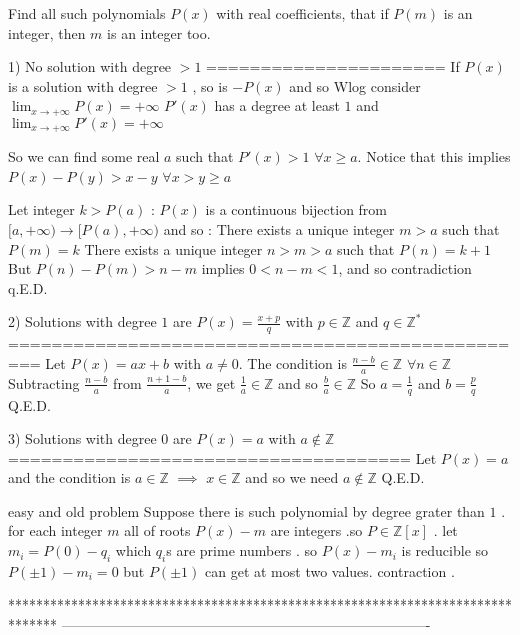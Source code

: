 \begin{solution}
	\begin{tcolorbox}Find all such polynomials $P(x)$ with real coefficients, that if $P(m)$ is an integer, then $m$ is an integer too.\end{tcolorbox}
1) No solution with degree $>1$
======================
If $P(x)$ is a solution with degree $>1$ , so is $-P(x)$ and so Wlog consider $\lim_{x\to+\infty}P(x)=+\infty$
$P'(x)$ has a degree at least $1$ and $\lim_{x\to+\infty}P'(x)=+\infty$

So we can find some real $a$ such that $P'(x)>1$ $\forall x\ge a$. Notice that this implies $P(x)-P(y)>x-y$ $\forall x>y\ge a$

Let integer $k>P(a)$ :
$P(x)$ is a continuous bijection from $[a,+\infty)\to[P(a),+\infty)$ and so :
There exists a unique integer $m>a$ such that $P(m)=k$
There exists a unique integer $n>m>a$ such that $P(n)=k+1$
But $P(n)-P(m)>n-m$ implies $0<n-m<1$, and so contradiction
q.E.D.

2) Solutions with degree $1$ are $P(x)=\frac{x+p}q$ with $p\in\mathbb Z$ and $q\in\mathbb Z^*$
=================================================
Let $P(x)=ax+b$ with $a\ne 0$. The condition is $\frac{n-b}a\in\mathbb Z$ $\forall n\in\mathbb Z$
Subtracting $\frac {n-b}a$ from $\frac {n+1-b}a$, we get $\frac 1a\in\mathbb Z$ and so $\frac ba\in\mathbb Z$
So $a=\frac 1q$ and $b=\frac pq$
Q.E.D.

3) Solutions with degree $0$ are $P(x)=a$ with $a\notin\mathbb Z$
=====================================
Let $P(x)=a$ and the condition is $a\in\mathbb Z$ $\implies$ $x\in\mathbb Z$ and so we need $a\notin\mathbb Z$
Q.E.D.
\end{solution}



\begin{solution}
	easy and old problem
Suppose there is such polynomial by degree grater than $1$ . for each integer $m$ all of roots $P(x)-m$ are integers .so $P\in \mathbb{Z}[x]$ . let $m_{i}=P(0)-q_{i}$ which $q_{i}$s are prime numbers . so $P(x)-m_{i}$ is reducible so $P(\pm 1)-m_{i}=0$ but $P(\pm 1)$ can get at most two values. contraction .
\end{solution}
*******************************************************************************
-------------------------------------------------------------------------------

